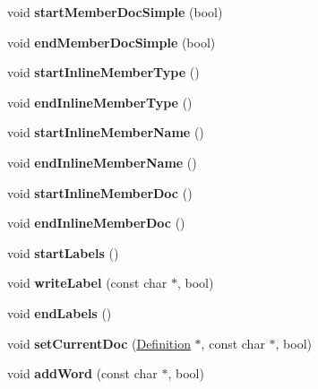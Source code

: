\begin{DoxyCompactItemize}
void {\bfseries start\+Member\+Doc\+Simple} (bool)
\item 
\mbox{\label{class_docbook_generator_afd609de12848e1d8f68b3ff905577b12}} 
void {\bfseries end\+Member\+Doc\+Simple} (bool)
\item 
\mbox{\label{class_docbook_generator_a6bdd8f0c4de168f61ce8cbbee470f5bc}} 
void {\bfseries start\+Inline\+Member\+Type} ()
\item 
\mbox{\label{class_docbook_generator_a78a214d69be5f360d1ebc73bed504907}} 
void {\bfseries end\+Inline\+Member\+Type} ()
\item 
\mbox{\label{class_docbook_generator_a878b26134b4ca8355580c15d93d6e489}} 
void {\bfseries start\+Inline\+Member\+Name} ()
\item 
\mbox{\label{class_docbook_generator_aed41f5c2996d2c2fd194098e1eb3dc0e}} 
void {\bfseries end\+Inline\+Member\+Name} ()
\item 
\mbox{\label{class_docbook_generator_ae60618298ae71702c75f6433790aa3e4}} 
void {\bfseries start\+Inline\+Member\+Doc} ()
\item 
\mbox{\label{class_docbook_generator_a8c105c96de7a015a927814327995d757}} 
void {\bfseries end\+Inline\+Member\+Doc} ()
\item 
\mbox{\label{class_docbook_generator_aea95d234f19699e2aeb49f6bddc17fbf}} 
void {\bfseries start\+Labels} ()
\item 
\mbox{\label{class_docbook_generator_a3020b0f82e1790202a2b128b2f0e9475}} 
void {\bfseries write\+Label} (const char $\ast$, bool)
\item 
\mbox{\label{class_docbook_generator_aeea004a622e23c0a4f86c2f911614727}} 
void {\bfseries end\+Labels} ()
\item 
\mbox{\label{class_docbook_generator_ad7b8e49fe4ddb6c11239000c733c9bcb}} 
void {\bfseries set\+Current\+Doc} (\mbox{\hyperlink{class_definition}{Definition}} $\ast$, const char $\ast$, bool)
\item 
\mbox{\label{class_docbook_generator_ac65a0c44513fe2cf52b01f125ea979ef}} 
void {\bfseries add\+Word} (const char $\ast$, bool)
\end{DoxyCompactItemize}
